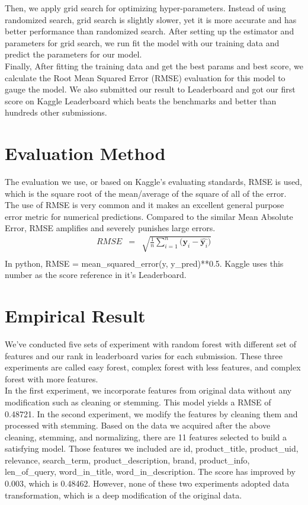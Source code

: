 \documentclass{sig-alternate-05-2015}
\begin{document}
Then, we apply grid search for optimizing hyper-parameters. Instead of using randomized search, grid search is slightly slower, yet it is more accurate and has better performance than randomized search.\cite{grid} After setting up the estimator and parameters for grid search, we run fit the model with our training data and predict the parameters for our model.\\

Finally, After fitting the training data and get the best params and best score, we calculate the Root Mean Squared Error (RMSE) evaluation for this model to gauge the model. We also submitted our result to Leaderboard and got our first score on Kaggle Leaderboard which beats the benchmarks and better than hundreds other submissions. \\
\section{Evaluation Method}
The evaluation we use, or based on Kaggle's evaluating standards, RMSE is used, which is the square root of the mean/average of the square of all of the error. The use of RMSE is very common and it makes an excellent general purpose error metric for numerical predictions. \cite{kaggle} Compared to the similar Mean Absolute Error, RMSE amplifies and severely punishes large errors.\\
\begin{eqnarray*}
RMSE & = &\sqrt{ \frac{1}{n} \sum_{i = 1}^{n}({\mathbf{y}_i  -  \hat{\mathbf{y}_i})}} \\
\end{eqnarray*}
In python, RMSE = mean\_squared\_error(y, y\_pred)**0.5. Kaggle uses this number as the score reference in it's Leaderboard.

\section{Empirical Result}

We've conducted five sets of experiment with random forest with different set of features and our rank in leaderboard varies for each submission. These three experiments are called easy forest, complex forest with less features, and complex forest with more features. \\

In the first experiment, we incorporate features from original data without any modification such as cleaning or stemming. This model yields a RMSE of 0.48721. In the second experiment, we modify the features by cleaning them and processed with stemming. Based on the data we acquired after the above cleaning, stemming, and normalizing, there are 11 features selected to build a satisfying model. Those features we included are id,  product\_title, product\_uid, relevance, search\_term, product\_description, brand, product\_info, len\_of\_query, word\_in\_title, word\_in\_description. The score has improved by 0.003, which is 0.48462. However, none of these two experiments adopted data transformation, which is a deep modification of the original data.\\
\end{document}
